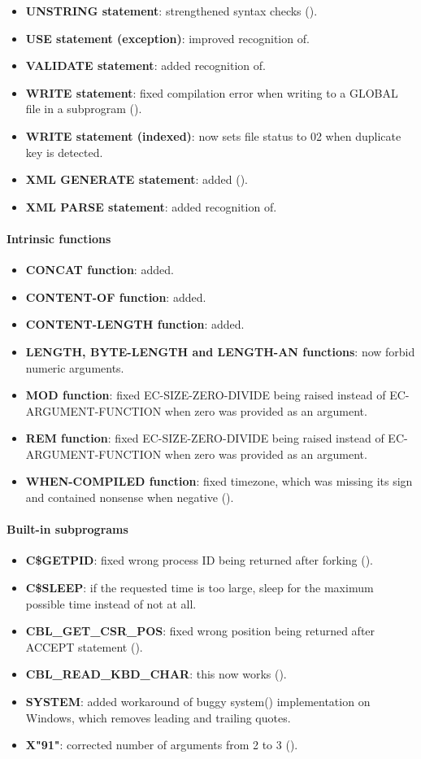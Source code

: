 \begin{itemize}
\item \textbf{UNSTRING statement}: strengthened syntax checks ().
\item \textbf{USE statement (exception)}: improved recognition of.
\item \textbf{VALIDATE statement}: added recognition of.
\item \textbf{WRITE statement}: fixed compilation error when writing to a GLOBAL file in a subprogram ().
\item \textbf{WRITE statement (indexed)}: now sets file status to 02 when duplicate key is detected.
\item \textbf{XML GENERATE statement}: added ().
\item \textbf{XML PARSE statement}: added recognition of.
\end{itemize}

\paragraph{Intrinsic functions}
\begin{itemize}
\item \textbf{CONCAT function}: added.
\item \textbf{CONTENT-OF function}: added.
\item \textbf{CONTENT-LENGTH function}: added.
\item \textbf{LENGTH, BYTE-LENGTH and LENGTH-AN functions}: now forbid numeric arguments.
\item \textbf{MOD function}: fixed EC-SIZE-ZERO-DIVIDE being raised instead of EC-ARGUMENT-FUNCTION when zero was provided as an argument.
\item \textbf{REM function}: fixed EC-SIZE-ZERO-DIVIDE being raised instead of EC-ARGUMENT-FUNCTION when zero was provided as an argument.
\item \textbf{WHEN-COMPILED function}: fixed timezone, which was missing its sign and contained nonsense when negative ().
\end{itemize}

\paragraph{Built-in subprograms}
\begin{itemize}
\item \textbf{C\$GETPID}: fixed wrong process ID being returned after forking ().
\item \textbf{C\$SLEEP}: if the requested time is too large, sleep for the maximum possible time instead of not at all.
\item \textbf{CBL\_GET\_CSR\_POS}: fixed wrong position being returned after ACCEPT statement ().
\item \textbf{CBL\_READ\_KBD\_CHAR}: this now works ().
\item \textbf{SYSTEM}: added workaround of buggy system() implementation on Windows, which removes leading and trailing quotes.
\item \textbf{X"91"}: corrected number of arguments from 2 to 3 ().
\end{itemize}

